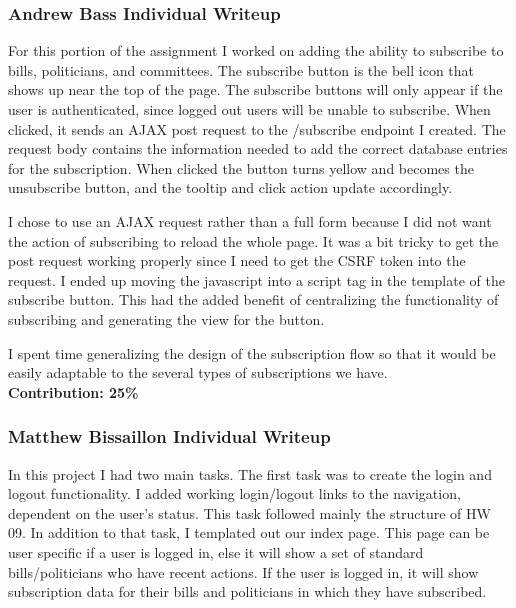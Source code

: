 \documentclass{article}
\newcommand{\n}{\noindent}
\begin{document}
\pagebreak

\subsubsection*{Andrew Bass Individual Writeup}
For this portion of the assignment I worked on adding the ability to subscribe to bills, politicians, and committees.  The subscribe button is the bell icon that shows up near
the top of the page. The subscribe buttons will only appear if the user is authenticated, since logged out users will be unable
to subscribe.  When clicked, it sends an AJAX post request to the /subscribe endpoint I created.  The request body contains the information
needed to add the correct database entries for the subscription.  When clicked the button turns yellow and becomes the unsubscribe button, and the tooltip and click action
update accordingly. 

I chose to use an AJAX request rather than a full form because I did not want the action of 
subscribing to reload the whole page.   It was a bit tricky to get the post request working properly since I need to get the CSRF token into 
the request.  I ended up moving the javascript into a script tag in the template of the subscribe button.  This had the added benefit of centralizing
the functionality of subscribing and generating the view for the button. 

I spent time generalizing the design of the subscription flow so that it would be easily adaptable to the several types of
subscriptions we have. \\


\n\textbf{Contribution: 25\%}

\pagebreak

\subsubsection*{Matthew Bissaillon Individual Writeup}

In this project I had two main tasks. The first task was to create the login and logout functionality. I added working login/logout links to the navigation, dependent on the user's status. This task followed mainly the structure of HW 09. In addition to that task, I templated out our index page. This page can be user specific if a user is logged in, else it will show a set of standard bills/politicians who have recent actions. If the user is logged in, it will show subscription data for their bills and politicians in which they have subscribed.
\end{document}
